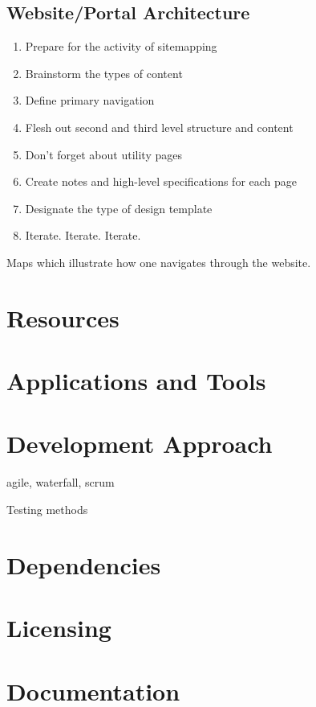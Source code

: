 \documentclass[11pt]{IEEEtran}
\begin{document}
\subsection{Website/Portal Architecture} \label{sec:WebsiteArchitecture}

\begin{enumerate}
\item Prepare for the activity of sitemapping
\item Brainstorm the types of content
\item Define primary navigation
\item Flesh out second and third level structure and content
\item Don’t forget about utility pages
\item Create notes and high-level specifications for each page
\item Designate the type of design template
\item Iterate. Iterate. Iterate.
\end{enumerate}

Maps which illustrate how one navigates through the website. 

\section{Resources} \label{sec:Resources}

\section{Applications and Tools} \label{sec:ApplicationsAndTools}

\section{Development Approach} \label{sec:Development Approach}

agile, waterfall, scrum

Testing methods

\section{Dependencies} \label{sec:Dependencies}


\section{Licensing} \label{sec:Licensing}

\section{Documentation} \label{sec:Documentation}
\end{document}
